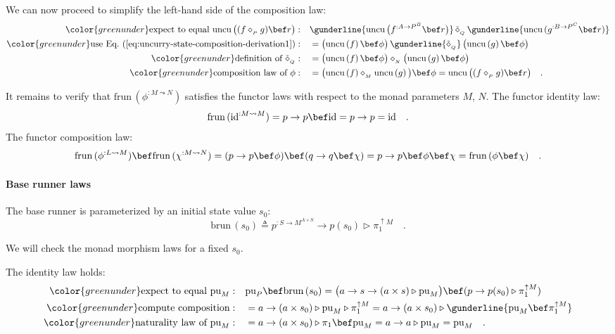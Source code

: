 We can now proceed to simplify the left-hand side of the composition
law:
\begin{align*}
{\color{greenunder}\text{expect to equal }\text{uncu}\,\big((f\diamond_{_{P}}g)\bef r\big):}\quad & \gunderline{\text{uncu}\,\big(f^{:A\rightarrow P^{B}}\bef r\big)}\,\tilde{\diamond}_{_{Q}}\,\gunderline{\text{uncu}\,(g^{:B\rightarrow P^{C}}\bef r)}\\
{\color{greenunder}\text{use Eq.~(\ref{eq:uncurry-state-composition-derivation1})}:}\quad & =\big(\text{uncu}\left(f\right)\bef\phi\big)\,\gunderline{\tilde{\diamond}_{_{Q}}}\,\big(\text{uncu}\left(g\right)\bef\phi\big)\\
{\color{greenunder}\text{definition of }\tilde{\diamond}_{_{Q}}:}\quad & =\big(\text{uncu}\left(f\right)\bef\phi\big)\diamond_{_{N}}\big(\text{uncu}\left(g\right)\bef\phi\big)\\
{\color{greenunder}\text{composition law of }\phi:}\quad & =\big(\text{uncu}\left(f\right)\diamond_{_{M}}\text{uncu}\left(g\right)\big)\bef\phi=\text{uncu}\,\big((f\diamond_{_{P}}g)\bef r\big)\quad.
\end{align*}

It remains to verify that $\text{frun}\,(\phi^{:M\leadsto N})$ satisfies
the functor laws with respect to the monad parameters $M$, $N$.
The functor identity law:
\[
\text{frun}\,(\text{id}^{:M\leadsto M})=p\rightarrow p\bef\text{id}=p\rightarrow p=\text{id}\quad.
\]
The functor composition law:
\[
\text{frun}\,(\phi^{:L\leadsto M})\bef\text{frun}\,(\chi^{:M\leadsto N})=(p\rightarrow p\bef\phi)\bef(q\rightarrow q\bef\chi)=p\rightarrow p\bef\phi\bef\chi=\text{frun}\,(\phi\bef\chi)\quad.
\]


\paragraph{Base runner laws}

The base runner is parameterized by an initial state value $s_{0}$:
\[
\text{brun}\,(s_{0})\triangleq p^{:S\rightarrow M^{A\times S}}\rightarrow p(s_{0})\triangleright\pi_{1}^{\uparrow M}\quad.
\]

We will check the monad morphism laws for a fixed $s_{0}$. 

The identity law holds:
\begin{align*}
{\color{greenunder}\text{expect to equal }\text{pu}_{M}:}\quad & \text{pu}_{P}\bef\text{brun}\,(s_{0})=\big(a\rightarrow s\rightarrow(a\times s)\triangleright\text{pu}_{M}\big)\bef(p\rightarrow p(s_{0})\triangleright\pi_{1}^{\uparrow M})\\
{\color{greenunder}\text{compute composition}:}\quad & =a\rightarrow(a\times s_{0})\triangleright\text{pu}_{M}\triangleright\pi_{1}^{\uparrow M}=a\rightarrow(a\times s_{0})\triangleright\gunderline{\text{pu}_{M}\bef\pi_{1}^{\uparrow M}}\\
{\color{greenunder}\text{naturality law of }\text{pu}_{M}:}\quad & =a\rightarrow(a\times s_{0})\triangleright\pi_{1}\bef\text{pu}_{M}=a\rightarrow a\triangleright\text{pu}_{M}=\text{pu}_{M}\quad.
\end{align*}

